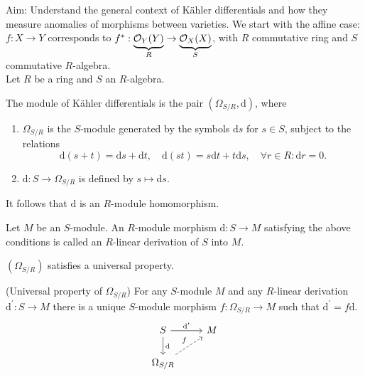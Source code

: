 \documentclass[a4paper,11pt]{article}
\begin{document}
				\noindent Aim: Understand the general context of K{\"a}hler differentials and how they measure anomalies of morphisms between varieties. We start with the affine case: $f:X\rightarrow Y$ corresponds to $f^\ast:\underbrace{\mathcal{O}_Y(Y)}_{R}\rightarrow\underbrace{\mathcal{O}_X(X)}_{S}$, with $R$ commutative ring and $S$ commutative $R$-algebra.
				\\

				\noindent Let $R$ be a ring and $S$ an $R$-algebra.

				\begin{defi}
					The module of K{\"a}hler differentials is the pair $(\Omega_{S/R},\mathrm{d})$, where 
					\begin{enumerate}
						\item $\Omega_{S/R}$ is the $S$-module generated by the symbols $\mathrm{d}s$ for $s\in S$, subject to the relations
						\begin{equation*}
							\mathrm{d}(s+t)=\mathrm{d}s+\mathrm{d}t,\quad\mathrm{d}(st)=s\mathrm{d}t+t\mathrm{d}s,\quad \forall r\in R:\mathrm{d}r=0.
						\end{equation*}
						\item $\mathrm{d}:S\rightarrow\Omega_{S/R}$ is defined by $s\mapsto \mathrm{d}s$.
					\end{enumerate}
				\end{defi}

				\begin{remark}
					It follows that $\mathrm{d}$ is an $R$-module homomorphism.  
				\end{remark}

				\begin{defi}
					Let $M$ be an $S$-module. An $R$-module morphism $\mathrm{d}:S\rightarrow M$ satisfying the above conditions is called an $R$-linear derivation of $S$ into $M$.
				\end{defi}

				$(\Omega_{S/R})$ satisfies a universal property.

				\begin{prop}\label{prop--kahlerdiff-universal}
					(Universal property of $\Omega_{S/R}$)
					For any $S$-module $M$ and any $R$-linear derivation $\mathrm{d}^{\prime}:S\rightarrow M$ there is a unique $S$-module morphism $f:\Omega_{S/R}\rightarrow M$ such that $\mathrm{d}^{\prime}=f\mathrm{d}$.
					\begin{equation*}
						\begin{tikzcd}
							S\ar[r,"\mathrm{d}^\prime"]\ar[d,"\mathrm{d}"] & M\\
							\Omega_{S/R}\ar[ur,dashed,"f"] &
						\end{tikzcd}
					\end{equation*}
				\end{prop}
\end{document}
